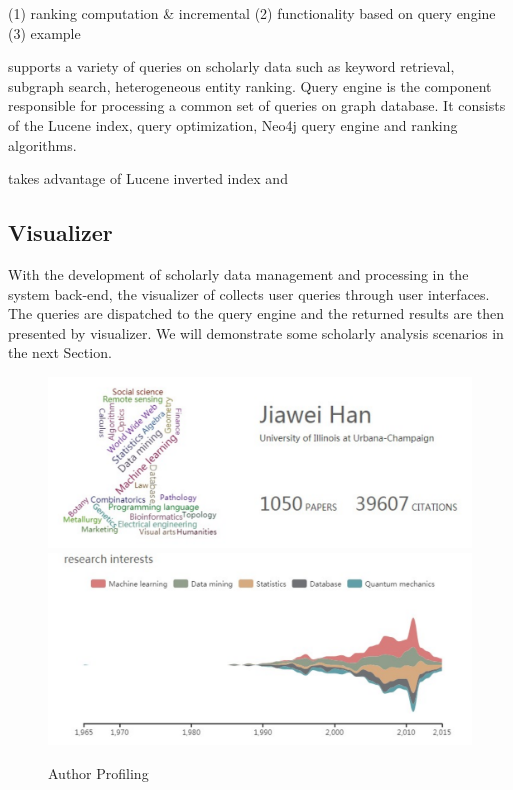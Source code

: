 (1) ranking computation \& incremental
(2) functionality based on query engine
(3) example

\oursystem supports a variety of queries on scholarly data such as keyword retrieval, subgraph search, heterogeneous entity ranking. Query engine is the component responsible for processing a common set of queries on graph database. It consists of the Lucene index, query optimization, Neo4j query engine and ranking algorithms.

\oursystem takes advantage of Lucene inverted index and 


\subsection{Visualizer}
With the development of scholarly data management and processing in the system back-end, the visualizer of \oursystem collects user queries through user interfaces. The queries are dispatched to the query engine and the returned results are then presented by visualizer.
We will demonstrate some scholarly analysis scenarios in the next Section.

\begin{figure}
\centering
\includegraphics[width=\columnwidth]{hjwAvatar.pdf}
\includegraphics[width=\columnwidth]{hjwInterest.pdf}
\caption{Author Profiling}
\label{fig:hjwProfile}
\vspace{-3ex}
\end{figure}

